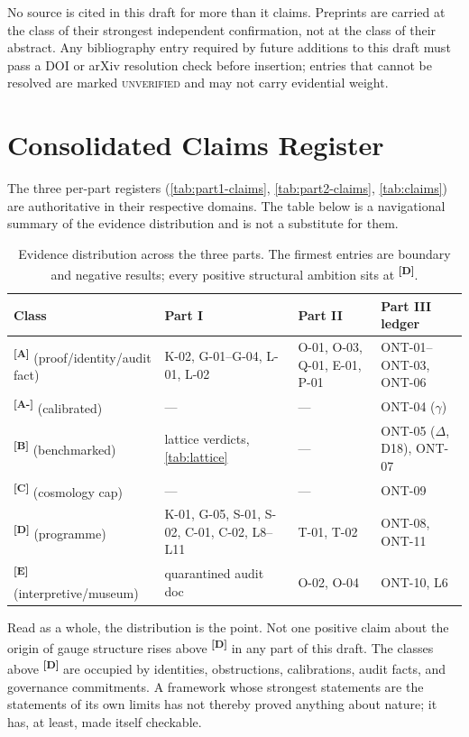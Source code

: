 \documentclass[12pt,a4paper,twoside]{article}
\theoremstyle{plain}
\theoremstyle{definition}
\theoremstyle{remark}
\newcommand{\catmark}[1]{\textsuperscript{\textsf{\textbf{[#1]}}}}
\begin{document}
\noindent No source is cited in this draft for more than it claims.
Preprints are carried at the class of their strongest independent
confirmation, not at the class of their abstract. Any bibliography entry
required by future additions to this draft must pass a DOI or arXiv
resolution check before insertion; entries that cannot be resolved are
marked \textsc{unverified} and may not carry evidential weight.

\section{Consolidated Claims Register}
\label{sec:consolidated-claims}

\noindent The three per-part registers (\cref{tab:part1-claims},
\cref{tab:part2-claims}, \cref{tab:claims}) are authoritative in their
respective domains. The table below is a navigational summary of the
evidence distribution and is not a substitute for them.

\begin{table}[htbp]
\centering\scriptsize
\begin{tabular}{@{}p{2.5cm}p{3.4cm}p{3.2cm}p{3.4cm}@{}}
\toprule
Class & Part I & Part II & Part III ledger \\
\midrule
\catmark{A} (proof/identity/audit fact) & K-02, G-01--G-04, L-01, L-02 & O-01, O-03, Q-01, E-01, P-01 & ONT-01--ONT-03, ONT-06 \\
\catmark{A-} (calibrated) & --- & --- & ONT-04 ($\gamma$) \\
\catmark{B} (benchmarked) & lattice verdicts, \cref{tab:lattice} & --- & ONT-05 ($\Delta$, D18), ONT-07 \\
\catmark{C} (cosmology cap) & --- & --- & ONT-09 \\
\catmark{D} (programme) & K-01, G-05, S-01, S-02, C-01, C-02, L8--L11 & T-01, T-02 & ONT-08, ONT-11 \\
\catmark{E} (interpretive/museum) & quarantined audit doc & O-02, O-04 & ONT-10, L6 \\
\bottomrule
\end{tabular}
\caption{Evidence distribution across the three parts. The firmest
entries are boundary and negative results; every positive structural
ambition sits at \catmark{D}.}
\label{tab:consolidated}
\end{table}

\noindent Read as a whole, the distribution is the point. Not one
positive claim about the origin of gauge structure rises above
\catmark{D} in any part of this draft. The classes above \catmark{D} are
occupied by identities, obstructions, calibrations, audit facts, and
governance commitments. A framework whose strongest statements are the
statements of its own limits has not thereby proved anything about
nature; it has, at least, made itself checkable.
\end{document}

